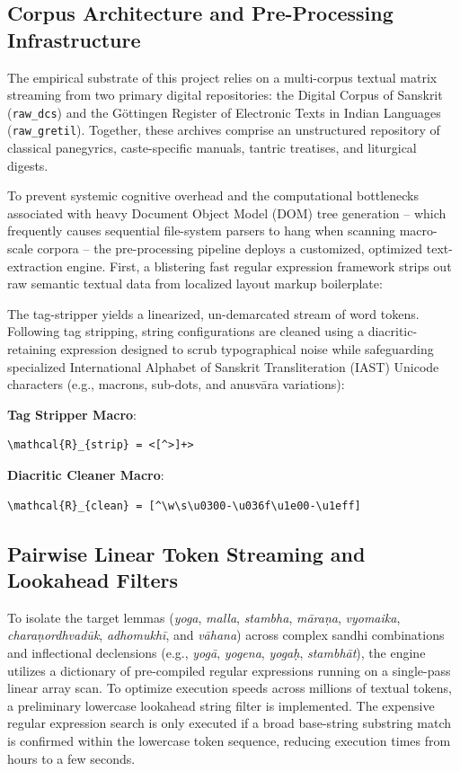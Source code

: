 \documentclass[11pt,twoside,letterpaper]{article}
\begin{document}
\subsection{Corpus Architecture and Pre-Processing Infrastructure}
The empirical substrate of this project relies on a multi-corpus textual matrix streaming from two primary digital repositories: the Digital Corpus of Sanskrit (\texttt{raw\_dcs}) and the Göttingen Register of Electronic Texts in Indian Languages (\texttt{raw\_gretil}). Together, these archives comprise an unstructured repository of classical panegyrics, caste-specific manuals, tantric treatises, and liturgical digests.

To prevent systemic cognitive overhead and the computational bottlenecks associated with heavy Document Object Model (DOM) tree generation -- which frequently causes sequential file-system parsers to hang when scanning macro-scale corpora -- the pre-processing pipeline deploys a customized, optimized text-extraction engine. First, a blistering fast regular expression framework strips out raw semantic textual data from localized layout markup boilerplate:

The tag-stripper yields a linearized, un-demarcated stream of word tokens. Following tag stripping, string configurations are cleaned using a diacritic-retaining expression designed to scrub typographical noise while safeguarding specialized International Alphabet of Sanskrit Transliteration (IAST) Unicode characters (e.g., macrons, sub-dots, and anusvāra variations):

\begin{center}
\small
\textbf{Tag Stripper Macro}:
\begin{verbatim}
\mathcal{R}_{strip} = <[^>]+>
\end{verbatim}
\end{center}

\begin{center}
\small
\textbf{Diacritic Cleaner Macro}:
\begin{verbatim}
\mathcal{R}_{clean} = [^\w\s\u0300-\u036f\u1e00-\u1eff]
\end{verbatim}
\end{center}


\subsection{Pairwise Linear Token Streaming and Lookahead Filters}
To isolate the target lemmas (\textit{yoga}, \textit{malla}, \textit{stambha}, \textit{māraṇa}, \textit{vyomaika}, \textit{charaṇordhvadūk}, \textit{adhomukhī}, and \textit{vāhana}) across complex sandhi combinations and inflectional declensions (e.g., \textit{yogā}, \textit{yogena}, \textit{yogaḥ}, \textit{stambhāt}), the engine utilizes a dictionary of pre-compiled regular expressions running on a single-pass linear array scan. To optimize execution speeds across millions of textual tokens, a preliminary lowercase lookahead string filter is implemented. The expensive regular expression search is only executed if a broad base-string substring match is confirmed within the lowercase token sequence, reducing execution times from hours to a few seconds.
\end{document}
